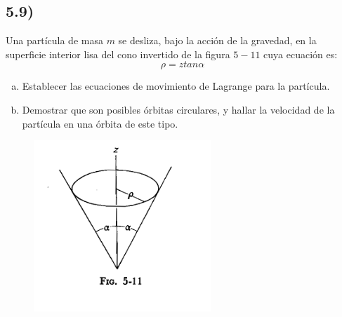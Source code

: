 \documentclass{article}
\begin{document}
\subsection*{5.9)}
Una partícula de masa $m$ se desliza, bajo la acción de la gravedad, en la superficie interior
lisa del cono invertido de la figura $5-11$ cuya ecuación es:
\[ \rho = ztan\alpha \]
\begin{enumerate}[a)]
    \item Establecer las ecuaciones de movimiento de Lagrange para la partícula.
    \item Demostrar que son posibles órbitas circulares, y hallar la velocidad de la 
    partícula en una órbita de este tipo.
\end{enumerate}
\begin{figure}[H]
    \centering
    \includegraphics[scale=1]{p3_cone.png}
\end{figure}
\end{document}
